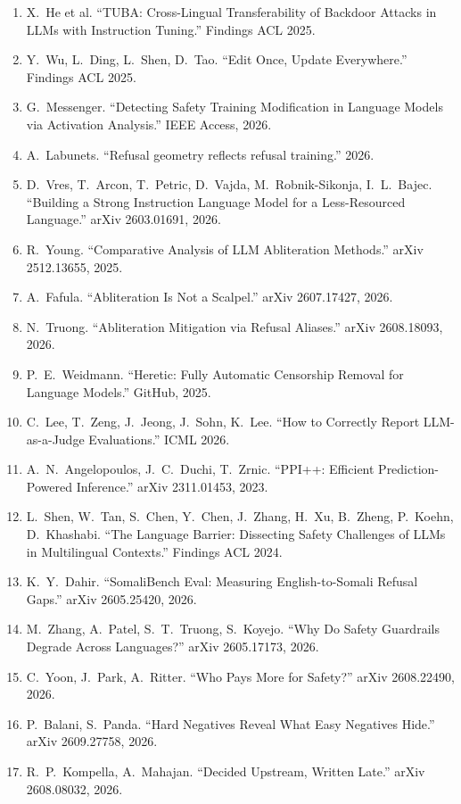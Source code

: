 \documentclass[11pt,letterpaper]{article}
\begin{document}
{\begin{enumerate}
\item X.~He et al. ``TUBA: Cross-Lingual Transferability of Backdoor Attacks in LLMs with Instruction Tuning.'' Findings ACL 2025.
\item Y.~Wu, L.~Ding, L.~Shen, D.~Tao. ``Edit Once, Update Everywhere.'' Findings ACL 2025.
\item G.~Messenger. ``Detecting Safety Training Modification in Language Models via Activation Analysis.'' IEEE Access, 2026.
\item A.~Labunets. ``Refusal geometry reflects refusal training.'' 2026.
\item D.~Vres, T.~Arcon, T.~Petric, D.~Vajda, M.~Robnik-Sikonja, I.~L.~Bajec. ``Building a Strong Instruction Language Model for a Less-Resourced Language.'' arXiv 2603.01691, 2026.
\item R.~Young. ``Comparative Analysis of LLM Abliteration Methods.'' arXiv 2512.13655, 2025.
\item A.~Fafula. ``Abliteration Is Not a Scalpel.'' arXiv 2607.17427, 2026.
\item N.~Truong. ``Abliteration Mitigation via Refusal Aliases.'' arXiv 2608.18093, 2026.
\item P.~E.~Weidmann. ``Heretic: Fully Automatic Censorship Removal for Language Models.'' GitHub, 2025.
\item C.~Lee, T.~Zeng, J.~Jeong, J.~Sohn, K.~Lee. ``How to Correctly Report LLM-as-a-Judge Evaluations.'' ICML 2026.
\item A.~N.~Angelopoulos, J.~C.~Duchi, T.~Zrnic. ``PPI++: Efficient Prediction-Powered Inference.'' arXiv 2311.01453, 2023.
\item L.~Shen, W.~Tan, S.~Chen, Y.~Chen, J.~Zhang, H.~Xu, B.~Zheng, P.~Koehn, D.~Khashabi. ``The Language Barrier: Dissecting Safety Challenges of LLMs in Multilingual Contexts.'' Findings ACL 2024.
\item K.~Y.~Dahir. ``SomaliBench Eval: Measuring English-to-Somali Refusal Gaps.'' arXiv 2605.25420, 2026.
\item M.~Zhang, A.~Patel, S.~T.~Truong, S.~Koyejo. ``Why Do Safety Guardrails Degrade Across Languages?'' arXiv 2605.17173, 2026.
\item C.~Yoon, J.~Park, A.~Ritter. ``Who Pays More for Safety?'' arXiv 2608.22490, 2026.
\item P.~Balani, S.~Panda. ``Hard Negatives Reveal What Easy Negatives Hide.'' arXiv 2609.27758, 2026.
\item R.~P.~Kompella, A.~Mahajan. ``Decided Upstream, Written Late.'' arXiv 2608.08032, 2026.

\end{enumerate}}
\end{document}
